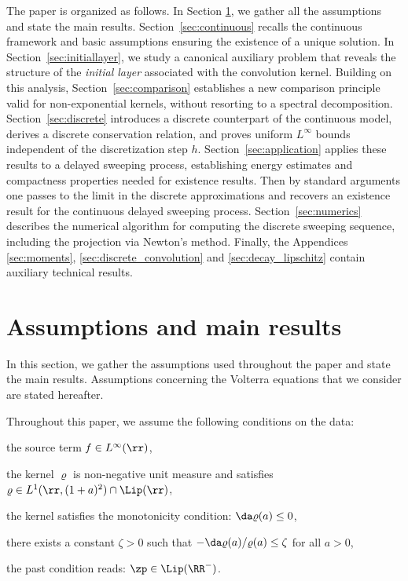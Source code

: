 \documentclass[]{jnsao}
\newcommand{\kernel}{\varrho}
\begin{document}
The paper is organized as follows. 
In Section \ref{sec:assumptions}, we gather all the assumptions and state the main results.
Section~\ref{sec:continuous} recalls the 
continuous framework and basic assumptions ensuring the existence of a unique solution. 
In Section~\ref{sec:initiallayer}, we study a canonical auxiliary problem that reveals 
the structure of the \emph{initial layer} associated with the convolution kernel. 
Building on this analysis, Section~\ref{sec:comparison} establishes a new comparison 
principle valid for non-exponential kernels, without resorting to a spectral decomposition. 
Section~\ref{sec:discrete} introduces a discrete counterpart of the continuous model, 
derives a discrete conservation relation, and proves uniform $L^\infty$ bounds independent 
of the discretization step $h$. Section~\ref{sec:application} applies these results to a 
delayed sweeping process, establishing energy estimates and compactness properties needed 
for existence results. Then by standard arguments one passes to the limit in the discrete
approximations and recovers an existence result for the continuous delayed sweeping process.
Section~\ref{sec:numerics} describes the numerical algorithm for computing the discrete sweeping sequence, including the projection via Newton's method.
Finally, the Appendices \ref{sec:moments},  \ref{sec:discrete_convolution} and \ref{sec:decay_lipschitz} contain auxiliary technical results.


\section{Assumptions and main results}\label{sec:assumptions}

In this section, we gather the assumptions used 
throughout the paper and state the main results.
Assumptions concerning the Volterra equations that
we consider are stated hereafter.
\begin{hypo}\label{hypo.data}
Throughout this paper, we assume the following conditions on the data:
	\begin{compactenum}[i)]
		\item the source term  $f \in L^\infty (\rr)$,  
		\item the kernel $\kernel$ is non-negative unit measure and satisfies $\kernel \in L^1(\rr,(1+a)^2)\cap \Lip(\rr)$,
		\item the kernel satisfies the monotonicity condition: $\da \kernel (a) \leq 0$,
		\item there exists a constant $\zeta > 0$ such that $- \da \kernel(a) / \kernel(a) \leq \zeta$ for all $a>0$,
		\item the past condition reads: $\zp \in \Lip (\RR^-)$.
	\end{compactenum}
\end{hypo}
\end{document}
